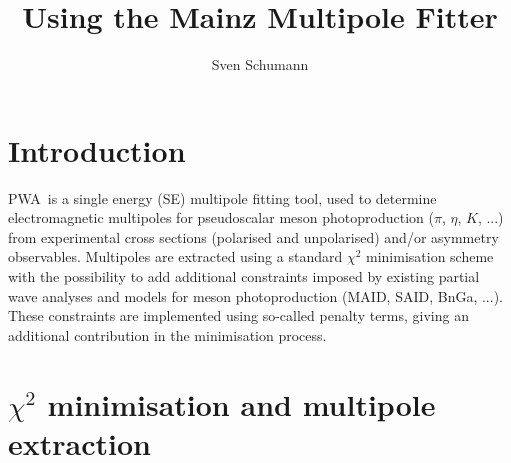 \documentclass[a4paper,10pt]{article}
\title{Using the Mainz Multipole Fitter \PWA}
\author{Sven Schumann}
\def\PWA{\ttfamily PWA\rmfamily\ }
\begin{document}
\maketitle

\begin{abstract}

\end{abstract}


\section{Introduction}

\PWA is a single energy (SE) multipole fitting tool, used to determine electromagnetic multipoles for pseudoscalar
meson photoproduction ($\pi$, $\eta$, $K$, ...) from experimental cross sections (polarised and unpolarised)
and/or asymmetry observables. Multipoles are extracted using a standard $\chi^2$ minimisation scheme with the
possibility to add additional constraints imposed by existing partial wave analyses and models for meson photoproduction
(MAID, SAID, BnGa, ...). These constraints are implemented using so-called penalty terms, giving an additional
contribution in the minimisation process.

\section{$\chi^2$ minimisation and multipole extraction}
\end{document}
